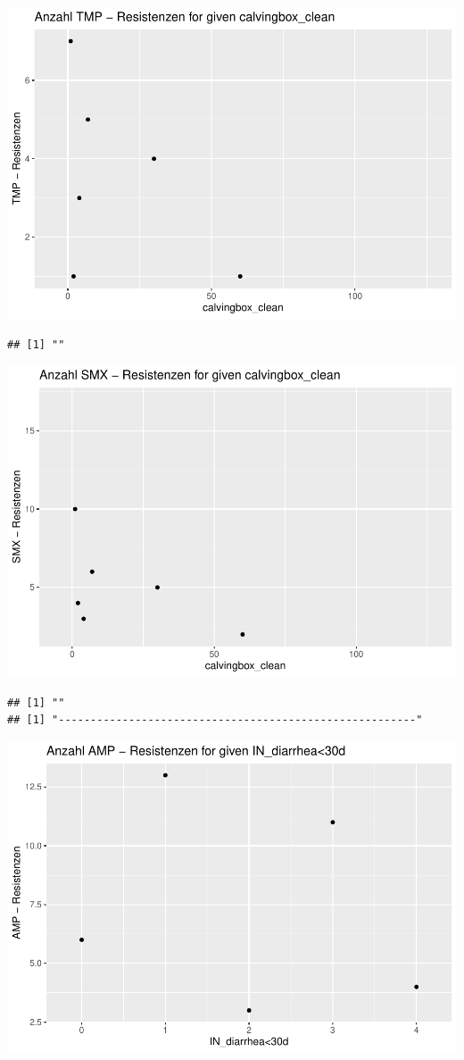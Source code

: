 \documentclass[
]{article}
\begin{document}
\includegraphics{NResistenzen_files/figure-latex/numerical_variables-29.pdf}

\begin{verbatim}
## [1] ""
\end{verbatim}

\includegraphics{NResistenzen_files/figure-latex/numerical_variables-30.pdf}

\begin{verbatim}
## [1] ""
## [1] "--------------------------------------------------------"
\end{verbatim}

\includegraphics{NResistenzen_files/figure-latex/numerical_variables-31.pdf}
\end{document}
